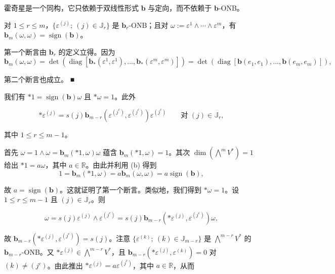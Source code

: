 \begin{remark}

\begin{items}
\item

霍奇星是一个同构，它只依赖于双线性形式 $ \mathbf{b} $ 与定向，而不依赖于 $ \mathbf{b} $-ONB。

\item

对 $ 1 \le r \le m $，$ \{\varepsilon^{(j)} ;\ (j) \in \mathbb{J}_r\} $ 是 $ \mathbf{b}_r $-ONB；且对 $ \omega := \varepsilon^1 \wedge \cdots \wedge \varepsilon^m $，有 $ \mathbf{b}_m(\omega, \omega) = \operatorname{sign}(\mathbf{b}) $。

\proofhead
第一个断言由 $ \mathbf{b}_r $ 的定义立得。因为
\[
\mathbf{b}_m(\omega,\omega) = \det(\operatorname{diag}[\mathbf{b}_*(\varepsilon^1,\varepsilon^1),\ldots,\mathbf{b}_*(\varepsilon^m,\varepsilon^m)]) = \det(\operatorname{diag}[\mathbf{b}(e_1,e_1),\ldots,\mathbf{b}(e_m,e_m)]) ,
\]

第二个断言也成立。 \nobreak\hspace{0.35em}■

\item

我们有 $ \ast 1 = \operatorname{sign}(\mathbf{b})\omega $ 且 $ \ast\omega = 1 $。此外

\[
\ast\varepsilon^{(j)} = s(j)\mathbf{b}_{m-r}(\varepsilon^{(j^c)}, \varepsilon^{(j^c)})\varepsilon^{(j^c)} \qquad \text{对 } (j) \in \mathbb{J}_r ,
\]

其中 $ 1 \le r \le m - 1 $。

\proofhead
首先 $ \omega = 1 \wedge \omega = \mathbf{b}_m(\ast 1, \omega)\omega $ 蕴含 $ \mathbf{b}_m(\ast 1, \omega) = 1 $。其次 $ \dim(\bigwedge^m V^*) = 1 $ 给出 $ \ast 1 = a\omega $，其中 $ a \in \mathbb{R} $。由此并利用 (b) 得到
\[
1 = \mathbf{b}_m(\ast 1, \omega) = a\mathbf{b}_m(\omega, \omega) = a\operatorname{sign}(\mathbf{b}) ,
\]

故 $ a = \operatorname{sign}(\mathbf{b}) $。这就证明了第一个断言。类似地，我们得到 $ \ast\omega = 1 $。设 $ 1 \le r \le m - 1 $ 且 $ (j) \in \mathbb{J}_r $。则

\[
\omega = s(j)\varepsilon^{(j)} \wedge \varepsilon^{(j^c)} = s(j)\mathbf{b}_{m-r}(\ast\varepsilon^{(j)}, \varepsilon^{(j^c)})\omega ,
\]

故 $ \mathbf{b}_{m-r}(\ast\varepsilon^{(j)}, \varepsilon^{(j^c)}) = s(j) $。注意 $ \{\varepsilon^{(k)} ;\ (k) \in \mathbb{J}_{m-r}\} $ 是 $ \bigwedge^{m-r} V^* $ 的 $ \mathbf{b}_{m-r} $-ONB。又 $ \ast\varepsilon^{(j)} \in \bigwedge^{m-r} V^* $，且 $ \mathbf{b}_{m-r}(\ast\varepsilon^{(j)}, \varepsilon^{(k)}) = 0 $ 对 $ (k) \neq (j^c) $。由此推出 $ \ast\varepsilon^{(j)} = a\varepsilon^{(j^c)} $，其中 $ a \in \mathbb{R} $，从而


\end{items}
\end{remark}
